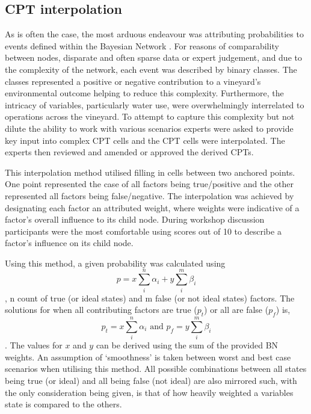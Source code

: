 \documentclass[fleqn,10pt]{wlscirep}
\begin{document}
\subsection{CPT interpolation}

As is often the case, the most arduous endeavour was attributing probabilities to events defined within the Bayesian Network . For reasons of comparability between nodes, disparate and often sparse data or expert judgement, and due to the complexity of the network, each event was described by binary classes. The classes represented a positive or negative contribution to a vineyard's environmental outcome helping to reduce this complexity. Furthermore, the intricacy of variables, particularly water use, were overwhelmingly interrelated to operations across the vineyard. To attempt to capture this complexity but not dilute the ability to work with various scenarios experts were asked to provide key input into complex CPT cells and the CPT cells were interpolated. The experts then reviewed and amended or approved the derived CPTs.

This interpolation method utilised filling in cells between two anchored points. One point represented the case of all factors being true/positive and the other represented all factors being false/negative. The interpolation was achieved by designating each factor an attributed weight, where weights were indicative of a factor's overall influence to its child node. During workshop discussion participants were the most comfortable using scores out of 10 to describe a factor's influence on its child node.

Using this method, a given probability was calculated using
\begin{equation}
        p=x\sum_{i}^{n}\alpha_{i} + y\sum_{i}^{m}\beta_{i} 
\end{equation},
n count of true (or ideal states) and m false (or not ideal states) factors. The solutions for when all contributing factors are true ($p_t$) or all are false ($p_f$) is,
\begin{equation}
        p_t=x\sum_{i}^{n}\alpha_{i} 
        \text{ and }
        p_f=y\sum_{i}^{m}\beta_{i}
\end{equation}.
The values for $x$ and $y$ can be derived using the sum of the provided BN weights. An assumption of `smoothness' is taken between worst and best case scenarios when utilising this method. All possible combinations between all states being true (or ideal) and all being false (not ideal) are also mirrored such, with the only consideration being given, is that of how heavily weighted a variables state is compared to the others.
\end{document}
